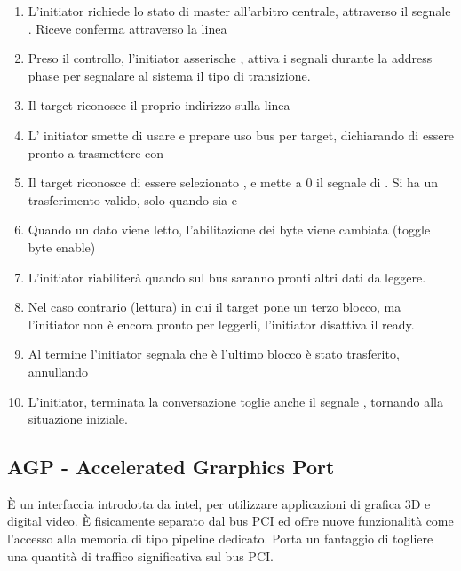 \documentclass[../template]{subfiles}
\begin{document}
\begin{enumerate}
    \item L'initiator richiede lo stato di master all'arbitro centrale, attraverso il segnale .
        Riceve conferma attraverso la linea 

    \item Preso il controllo, l'initiator asserische ,
        attiva i segnali  durante la address phase per segnalare al sistema il tipo di transizione.

    \item Il target riconosce il proprio indirizzo sulla linea 
    \item L' initiator smette di usare  e prepare uso bus per target, dichiarando di essere pronto a trasmettere con 

    \item
        Il target riconosce di essere selezionato , e mette a 0 il segnale di .
        Si ha un trasferimento valido, solo quando sia  e 

    \item
        Quando un dato viene letto, l'abilitazione dei byte viene cambiata (toggle byte enable)
    \item
        L'initiator riabiliterà  quando sul bus saranno pronti altri dati da leggere.
    \item Nel caso contrario (lettura) in cui il target pone un terzo blocco, ma l'initiator non è encora pronto per leggerli, l'initiator disattiva il ready.


    \item Al termine l'initiator segnala che è l'ultimo blocco è stato trasferito, annullando 
    \item L'initiator, terminata la conversazione toglie anche il segnale , tornando alla situazione iniziale.
\end{enumerate}

\subsection{AGP - Accelerated Grarphics Port}
È un interfaccia introdotta da intel, per utilizzare applicazioni di grafica 3D e digital video.
È fisicamente separato dal bus PCI ed offre nuove funzionalità come l'accesso alla memoria di tipo pipeline dedicato. Porta un fantaggio di togliere una quantità di traffico significativa sul bus PCI.
\end{document}
